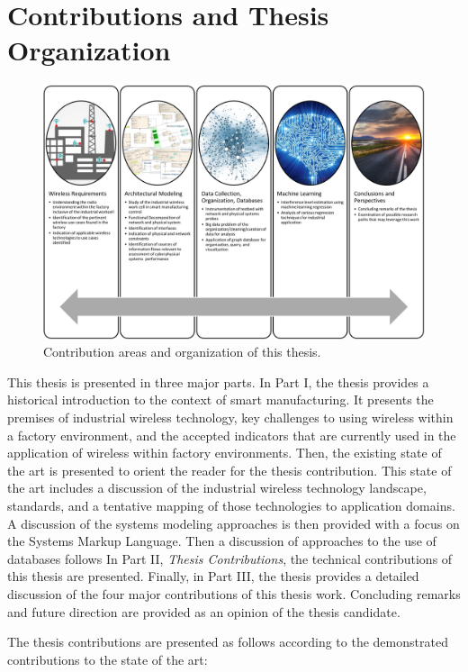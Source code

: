 \documentclass{article}
\begin{document}
	\section{Contributions and Thesis Organization}
	
		\begin{figure}[!tbhp]
			\includegraphics[width=\linewidth]{images/contributions}
			\caption{Contribution areas and organization of this thesis.}
			\label{fig:intro:contr-org}
		\end{figure}
		
		This thesis is presented in three major parts.  In Part I, the thesis provides a historical introduction to the context of smart manufacturing.  It presents the premises of industrial wireless technology, key challenges to using wireless within a factory environment, and the accepted indicators that are currently used in the application of wireless within factory environments. Then, the existing state of the art is presented to orient the reader for the thesis contribution.  This state of the art includes a discussion of the industrial wireless technology landscape, standards, and a tentative mapping of those technologies to application domains.  A discussion of the systems modeling approaches is then provided with a focus on the Systems Markup Language.  Then a discussion of approaches to the use of databases follows   In Part II, \textit{Thesis Contributions}, the technical contributions of this thesis are presented.  Finally, in Part III, the thesis provides a detailed discussion of the four major contributions of this thesis work.  Concluding remarks and future direction are provided as an opinion of the thesis candidate.  
		
		The thesis contributions are presented as follows according to the demonstrated contributions to the state of the art:
		
\end{document}
